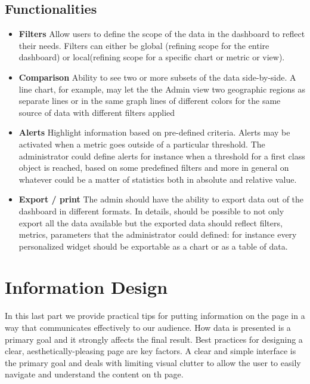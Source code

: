 \documentclass[a4paper,12pt]{report}
\begin{document}
\subsection{Functionalities}
\begin{itemize}
\item \textbf{Filters}\newline
Allow users to define the scope of the data in the dashboard to reflect their needs. Filters can either be global (refining scope for the entire dashboard) or local(refining scope for a specific chart or metric or view).

\item \textbf{Comparison}\newline
Ability to see two or more subsets of the data side-by-side. A line chart, for example, may let the the Admin view two geographic regions as separate lines or in the same graph lines of different colors for the same source of data with different filters applied

\item \textbf{Alerts}\newline
Highlight information based on pre-defined criteria. Alerts may be activated when a metric goes outside of a particular threshold.  The administrator could define alerts for instance when a threshold for a first class object is reached, based on some predefined filters and more in general on whatever could be a matter of statistics both in absolute and relative value.

\item \textbf{Export / print}\newline
The  admin should have the ability to export data out of the dashboard in different formats. In details, should be possible to not only export all the data available but the exported data should reflect filters, metrics, parameters that the administrator could defined: for instance every personalized widget should be exportable as a chart or as a table of data.
\end{itemize}

\section{Information Design}
In this last part we provide practical tips for putting information on the page in a way that communicates effectively to our audience. How data is presented is a primary goal and it strongly affects the final result. Best practices for designing a clear, aesthetically-pleasing page are key factors.\newline
A clear and simple interface is the primary goal and deals with limiting visual clutter to allow the user to easily navigate and understand the content on th page.
\end{document}
